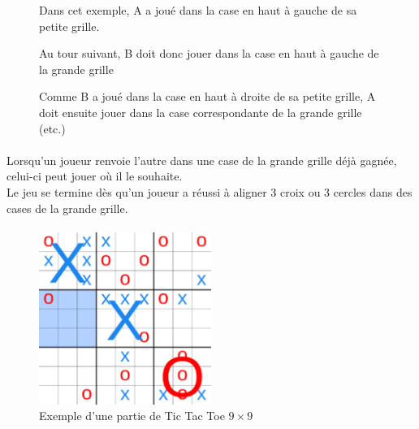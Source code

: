 \documentclass[10pt, french]{article}
\begin{document}
\begin{enumerate}
\begin{figure}
 \begin{minipage}[t]{0.25\linewidth}
  \centering{}
  \caption{Dans cet exemple, A a joué dans la case en haut à gauche de sa petite grille.}
 \end{minipage} \hfill
 \begin{minipage}[t]{0.25\linewidth}
  \centering{}
  \caption{Au tour suivant, B doit donc jouer dans la case en haut à gauche de la grande grille}
  \end{minipage} \hfill
 \begin{minipage}[t]{0.25\linewidth}
  \centering{}
  \caption{Comme B a joué dans la case en haut à droite de sa petite grille, A doit ensuite jouer dans la case correspondante de la grande grille (etc.)}
 \end{minipage}
\end{figure}


\paragraph{}
Lorsqu'un joueur renvoie l'autre dans une case de la grande grille déjà gagnée, celui-ci peut jouer où il le souhaite. \\

Le jeu se termine dès qu'un joueur a réussi à aligner 3 croix ou 3 cercles dans des cases de la grande grille. 


\paragraph{}
\begin{figure}[h!]
\centering
\includegraphics[width=0.5\textwidth]{exemple.png}
\caption{Exemple d'une partie de Tic Tac Toe $9\times9$}
\end{figure}


\end{enumerate}
\end{document}
